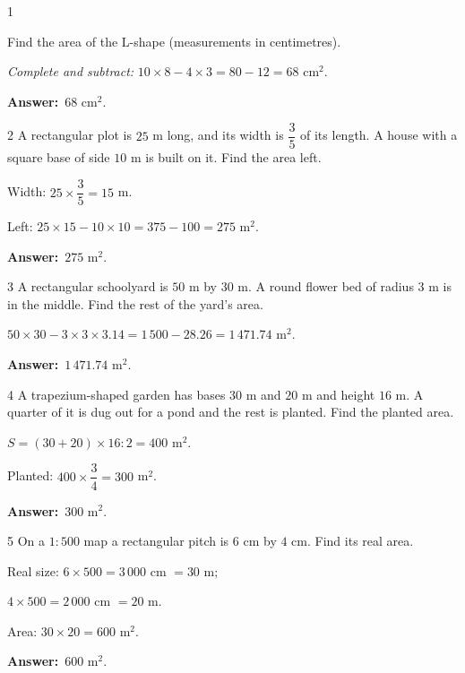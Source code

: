 \documentclass[11pt]{article}
\newif\ifsol \solfalse
\providecommand{\AnsWord}{Đáp số}
\newcommand{\dapso}[1]{\par\textbf{\AnsWord:}\ #1}
\newcommand{\probsol}[1]{%
  \begin{lrbox}{\solmeasure}\begin{minipage}{\dimexpr\linewidth-24pt\relax}#1\end{minipage}\end{lrbox}%
  \ifsol
    \begin{solbox}#1\end{solbox}%
  \else
    \setlength{\solht}{\dimexpr\ht\solmeasure+\dp\solmeasure+0.85cm\relax}%
    \ifdim\solht<1.35cm\setlength{\solht}{1.35cm}\fi
    \begin{tcolorbox}[colback=white,colframe=Line,boxrule=0.8pt,arc=5pt,
      left=8pt,right=8pt,top=4pt,bottom=4pt,height=\solht]{\footnotesize\color{Slate}\itshape\WorkWord}\end{tcolorbox}%
  \fi}
\newcommand{\gap}{\vspace{0.3cm}}
\def\WorkWord{Your work:}
\def\AnsWord{Answer}
\begin{document}
\begin{probbox}{1}{\relax}
\begin{minipage}[t]{0.66\linewidth}
Find the area of the L-shape (measurements in centimetres).
\end{minipage}\hfill
\begin{minipage}[t]{0.3\linewidth}\vspace{0pt}\centering
{}
\end{minipage}
\end{probbox}
\probsol{
\emph{Complete and subtract:} $10\times8-4\times3=80-12=68$ cm$^2$.
\dapso{$68$ cm$^2$.}}
\gap
\begin{probbox}{2}{\relax}
A rectangular plot is $25$ m long, and its width is $\dfrac35$ of its length. A house with a square base of side $10$ m is built on it. Find the area left.
\end{probbox}
\probsol{
Width: $25\times\dfrac35=15$ m.\par Left: $25\times15-10\times10=375-100=275$ m$^2$.
\dapso{$275$ m$^2$.}}
\gap
\begin{probbox}{3}{\relax}
A rectangular schoolyard is $50$ m by $30$ m. A round flower bed of radius $3$ m is in the middle. Find the rest of the yard's area.
\end{probbox}
\probsol{
$50\times30-3\times3\times3.14=1\,500-28.26=1\,471.74$ m$^2$.
\dapso{$1\,471.74$ m$^2$.}}
\gap
\begin{probbox}{4}{\relax}
A trapezium-shaped garden has bases $30$ m and $20$ m and height $16$ m. A quarter of it is dug out for a pond and the rest is planted. Find the planted area.
\end{probbox}
\probsol{
$S=(30+20)\times16:2=400$ m$^2$.\par Planted: $400\times\dfrac34=300$ m$^2$.
\dapso{$300$ m$^2$.}}
\gap
\begin{probbox}{5}{\relax}
On a $1:500$ map a rectangular pitch is $6$ cm by $4$ cm. Find its real area.
\end{probbox}
\probsol{
Real size: $6\times500=3\,000$ cm $=30$ m;\par $4\times500=2\,000$ cm $=20$ m.\par Area: $30\times20=600$ m$^2$.
\dapso{$600$ m$^2$.}}
\end{document}
